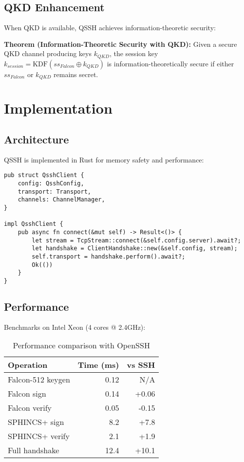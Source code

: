 \documentclass[11pt,a4paper]{article}
\begin{document}
\subsection{QKD Enhancement}

When QKD is available, QSSH achieves information-theoretic security:

\textbf{Theorem (Information-Theoretic Security with QKD):} Given a secure QKD channel producing keys $k_{QKD}$, the session key $k_{session} = \text{KDF}(ss_{Falcon} \oplus k_{QKD})$ is information-theoretically secure if either $ss_{Falcon}$ or $k_{QKD}$ remains secret.

\section{Implementation}

\subsection{Architecture}

QSSH is implemented in Rust for memory safety and performance:

\begin{lstlisting}[basicstyle=\small\ttfamily]
pub struct QsshClient {
    config: QsshConfig,
    transport: Transport,
    channels: ChannelManager,
}

impl QsshClient {
    pub async fn connect(&mut self) -> Result<()> {
        let stream = TcpStream::connect(&self.config.server).await?;
        let handshake = ClientHandshake::new(&self.config, stream);
        self.transport = handshake.perform().await?;
        Ok(())
    }
}
\end{lstlisting}

\subsection{Performance}

Benchmarks on Intel Xeon (4 cores @ 2.4GHz):

\begin{table}[h]
\centering
\begin{tabular}{|l|r|r|}
\hline
Operation & Time (ms) & vs SSH \\
\hline
Falcon-512 keygen & 0.12 & N/A \\
Falcon sign & 0.14 & +0.06 \\
Falcon verify & 0.05 & -0.15 \\
SPHINCS+ sign & 8.2 & +7.8 \\
SPHINCS+ verify & 2.1 & +1.9 \\
Full handshake & 12.4 & +10.1 \\
\hline
\end{tabular}
\caption{Performance comparison with OpenSSH}
\end{table}
\end{document}
